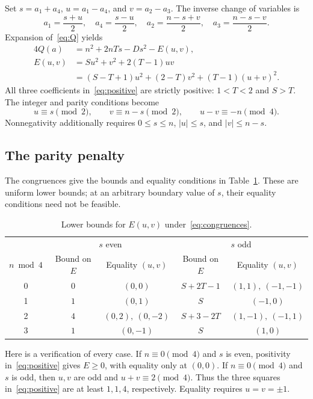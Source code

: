 \documentclass[11pt]{article}
\begin{document}
Set $s=a_1+a_4$, $u=a_1-a_4$, and $v=a_2-a_3$. The inverse change of
variables is
\begin{equation}\label{eq:inverse}
 a_1=\frac{s+u}{2},\quad a_4=\frac{s-u}{2},\quad
 a_2=\frac{n-s+v}{2},\quad a_3=\frac{n-s-v}{2}.
\end{equation}
Expansion of~\eqref{eq:Q} yields
\begin{align}
 4Q(a)&=n^2+2nTs-Ds^2-E(u,v),\label{eq:decomposition}\\
 E(u,v)&=Su^2+v^2+2(T-1)uv\nonumber\\
 &=(S-T+1)u^2+(2-T)v^2+(T-1)(u+v)^2.\label{eq:positive}
\end{align}
All three coefficients in~\eqref{eq:positive} are strictly positive:
$1<T<2$ and $S>T$. The integer and parity conditions become
\begin{equation}\label{eq:congruences}
 u\equiv s\pmod2,\qquad v\equiv n-s\pmod2,\qquad
 u-v\equiv-n\pmod4.
\end{equation}
Nonnegativity additionally requires $0\leq s\leq n$, $|u|\leq s$,
and $|v|\leq n-s$.

\subsection{The parity penalty}

The congruences give the bounds and equality conditions in
Table~\ref{tab:penalty}. These are uniform lower bounds; at an arbitrary
boundary value of $s$, their equality conditions need not be feasible.
\begin{table}[ht]
\centering
\begin{tabular}{ccccc}
\toprule
 & \multicolumn{2}{c}{$s$ even} & \multicolumn{2}{c}{$s$ odd}\\
$n\bmod4$ & Bound on $E$ & Equality $(u,v)$ & Bound on $E$ & Equality $(u,v)$\\
\midrule
0 & $0$ & $(0,0)$ & $S+2T-1$ & $(1,1),\ (-1,-1)$\\
1 & $1$ & $(0,1)$ & $S$ & $(-1,0)$\\
2 & $4$ & $(0,2),\ (0,-2)$ & $S+3-2T$ & $(1,-1),\ (-1,1)$\\
3 & $1$ & $(0,-1)$ & $S$ & $(1,0)$\\
\bottomrule
\end{tabular}
\caption{Lower bounds for $E(u,v)$ under~\eqref{eq:congruences}.}
\label{tab:penalty}
\end{table}

Here is a verification of every case. If $n\equiv0\pmod4$ and $s$ is
even, positivity in~\eqref{eq:positive} gives $E\geq0$, with equality
only at $(0,0)$. If $n\equiv0\pmod4$ and $s$ is odd, then $u,v$ are
odd and $u+v\equiv2\pmod4$. Thus the three squares in~\eqref{eq:positive}
are at least $1,1,4$, respectively. Equality requires $u=v=\pm1$.
\end{document}

